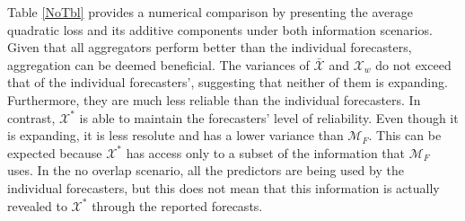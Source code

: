 \documentclass[11pt]{article}
\theoremstyle{definition}
\theoremstyle{definition}
\def\Y{{\bf Y}}
\begin{document}


Table \ref{NoTbl} provides a numerical comparison by presenting the average quadratic loss and its additive components under both information scenarios. Given that all aggregators perform better than the individual forecasters, aggregation can be deemed beneficial. The variances of $\bar{\mathcal{X}}$ and $\mathcal{X}_w$  do not exceed that of the individual forecasters', suggesting that neither of them is expanding. Furthermore, they are much less reliable than the individual forecasters. In contrast, $\mathcal{X}^*$ is able to maintain the forecasters' level of reliability. Even though it is expanding, it is less resolute and has a lower variance than $\mathcal{M}_F$. This can be expected because $\mathcal{X}^*$ has access only to a subset of the information that $\mathcal{M}_F$ uses. In the no overlap scenario, all the predictors are being used by the individual forecasters, but this does not mean that this information is actually revealed to $\mathcal{X}^*$ through the reported forecasts. 
\end{document}
